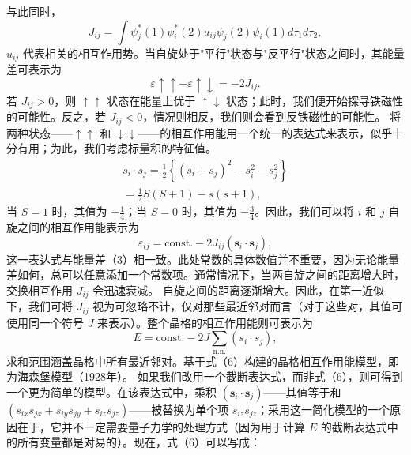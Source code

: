 与此同时，
\begin{equation}\tag{12.3.1}\label{eq:12.3.1}
J _ { i j } = \int \psi _ { j } ^{*} ( 1 ) \psi _ { i } ^{*} ( 2 ) u _ { i j } \psi _ { j } ( 2 ) \psi _ { i } ( 1 ) d \tau _ { 1 } d \tau _ { 2 } ,
\end{equation}
\(u_{ij}\) 代表相关的相互作用势。当自旋处于"平行"状态与"反平行"状态之间时，其能量差可表示为
\begin{equation}\tag{12.3.2}\label{eq:12.3.2}
\varepsilon \uparrow \uparrow - \varepsilon \uparrow \downarrow = - 2 J _ { i j } .
\end{equation}
若 \(J_{ij} > 0\)，则 \(\uparrow\uparrow\) 状态在能量上优于 \(\uparrow\downarrow\) 状态；此时，我们便开始探寻铁磁性的可能性。反之，若 \(J_{ij} < 0\)，情况则相反，我们则会看到反铁磁性的可能性。
将两种状态——\(\uparrow\uparrow\) 和 \(\downarrow\downarrow\)——的相互作用能用一个统一的表达式来表示，似乎十分有用；为此，我们考虑标量积的特征值。
\begin{equation}\tag{12.3.3}\label{eq:12.3.3}
\begin{array}{r} { s _ { i } \cdot s _ { j } = \frac { 1 } { 2 } \left\{ ( s _ { i } + s _ { j } ) ^{2} - s _ { i } ^{2} - s _ { j } ^{2} \right\} } \\{ = \frac { 1 } { 2 } S ( S + 1 ) - s ( s + 1 ) , } \end{array}
\end{equation}
当 \(S=1\) 时，其值为 \(+\frac{1}{4}\)；当 \(S=0\) 时，其值为 \(-\frac{3}{4}\)。因此，我们可以将 \(i\) 和 \(j\) 自旋之间的相互作用能表示为
\begin{equation}\tag{12.3.4}\label{eq:12.3.4}
\varepsilon _ { i j } = \mathrm { c o n s t . } - 2 J _ { i j } ( \pmb { s } _ { i } \cdot \pmb { s } _ { j } ) ,
\end{equation}
这一表达式与能量差（3）相一致。此处常数的具体数值并不重要，因为无论能量差如何，总可以任意添加一个常数项。通常情况下，当两自旋之间的距离增大时，交换相互作用 \(J_{ij}\) 会迅速衰减。
自旋之间的距离逐渐增大。因此，在第一近似下，我们可将 \(J_{ij}\) 视为可忽略不计，仅对那些最近邻对而言（对于这些对，其值可使用同一个符号 \(J\) 来表示）。整个晶格的相互作用能则可表示为
\begin{equation}\tag{12.3.5}\label{eq:12.3.5}
E = \mathrm { c o n s t . } - 2 J \sum _ { \mathrm { n . n . } } ( s _ { i } \cdot s _ { j } ) ,
\end{equation}
求和范围涵盖晶格中所有最近邻对。基于式（6）构建的晶格相互作用能模型，即为海森堡模型（1928年）。
如果我们改用一个截断表达式，而非式（6），则可得到一个更为简单的模型。在该表达式中，乘积 \((\mathbf{s}_i \cdot \mathbf{s}_j)\)——其值等于和 \((s_{ix} s_{jx} + s_{iy} s_{jy} + s_{iz} s_{jz})\)——被替换为单个项 \(s_{iz} s_{jz}\)；采用这一简化模型的一个原因在于，它并不一定需要量子力学的处理方式（因为用于计算 \(E\) 的截断表达式中的所有变量都是对易的）。现在，式（6）可以写成：
